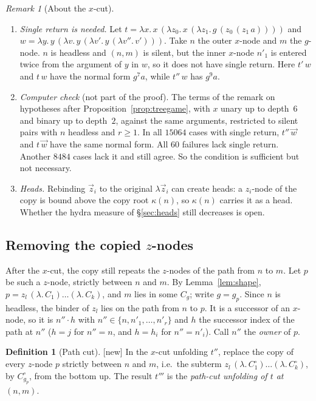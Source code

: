 \documentclass[11pt]{article}
\newcommand{\suc}[2]{#1{\cdot}#2}
\newcommand{\New}{\textsf{[new]}}
\theoremstyle{plain}
\theoremstyle{definition}
\newtheorem{definition}[theorem]{Definition}
\theoremstyle{remark}
\newtheorem{remark}[theorem]{Remark}
\begin{document}
\begin{remark}[About the $x$-cut]\label{rem:xcut}
\begin{enumerate}
\item \emph{Single return is needed.}  Let
  $t=\lambda x.\,x\,(\lambda z_0.\,x\,(\lambda z_1.\,g\,(z_0\,(z_1\,a))))$
  and $w=\lambda y.\,y\,(\lambda v.\,y\,(\lambda v'.\,y\,(\lambda v''.\,v')))$.
  Take $n$ the outer $x$-node and $m$ the $g$-node.  $n$ is headless and
  $(n,m)$ is silent, but the inner $x$-node $n'_1$ is entered twice from
  the argument of $y$ in $w$, so it does not have single return.  Here
  $t'\,w$ and $t\,w$ have the normal form $g^7a$, while $t''\,w$ has
  $g^9a$.
\item \emph{Computer check} (not part of the proof).  The terms of the
  remark on hypotheses after Proposition~\ref{prop:treegame}, with $x$
  unary up to depth~$6$ and binary up to depth~$2$, against the same
  arguments, restricted to silent pairs with $n$ headless and $r\ge1$.
  In all $15064$ cases with single return, $t''\,\vec w$ and $t\,\vec w$
  have the same normal form.  All $60$ failures lack single return.
  Another $8484$ cases lack it and still agree.  So the condition is
  sufficient but not necessary.
\item \emph{Heads.}  Rebinding $\vec z_i$ to the original $\lambda\vec
  z_i$ can create heads: a $z_i$-node of the copy is bound above the copy
  root $\kappa(n)$, so $\kappa(n)$ carries it as a head.  Whether the
  hydra measure of \S\ref{sec:heads} still decreases is open.
\end{enumerate}
\end{remark}

\subsection{Removing the copied $z$-nodes}\label{sec:zcut}

After the $x$-cut, the copy still repeats the $z$-nodes of the path from
$n$ to $m$.  Let $p$ be such a $z$-node, strictly between $n$ and $m$.
By Lemma~\ref{lem:shape},
$p=z_l\,(\lambda.\,C_1)\dots(\lambda.\,C_k)$, and $m$ lies in some
$C_{g}$; write $g=g_p$.  Since $n$ is headless, the binder of $z_l$ lies
on the path from $n$ to $p$.  It is a successor of an $x$-node, so it is
$\suc{n''}{h}$ with $n''\in\{n,n'_1,\dots,n'_r\}$ and $h$ the successor
index of the path at $n''$ ($h=j$ for $n''=n$, and $h=h_i$ for
$n''=n'_i$).  Call $n''$ the \emph{owner} of $p$.

\begin{definition}[Path cut]\label{def:pathcut}
\New{} In the $x$-cut unfolding $t''$, replace the copy of every
$z$-node $p$ strictly between $n$ and $m$, i.e.\ the subterm
$z_l\,(\lambda.\,C^\circ_1)\dots(\lambda.\,C^\circ_k)$, by
$C^\circ_{g_p}$, from the bottom up.  The result $t'''$ is the
\emph{path-cut unfolding of $t$ at $(n,m)$}.
\end{definition}
\end{document}
